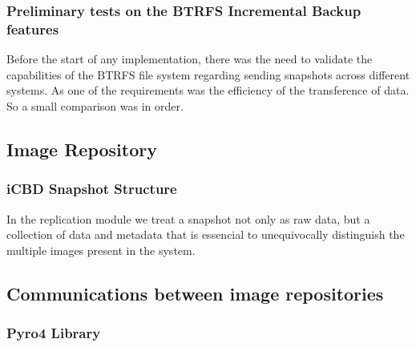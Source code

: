 \subsubsection{Preliminary tests on the BTRFS Incremental Backup features}
\label{subsub:pre_test_btrfs}


Before the start of any implementation, there was the need to validate the capabilities of the BTRFS file system regarding sending snapshots across different systems.
As one of the requirements was the efficiency of the transference of data. So a small comparison was in order. 


\subsection{Image Repository}
\label{sub:rep_image_repo}

\subsubsection{iCBD Snapshot Structure}
\label{subsub:icbd_snapshot}

In the replication module we treat a snapshot not only as raw data, but a collection of data and metadata that is essencial to unequivocally distinguish the multiple images present in the system. 


\subsection{Communications between image repositories}
\label{sub:rep_rpcs}


\subsubsection{Pyro4 Library}
\label{subsub:rep_pyro4}


